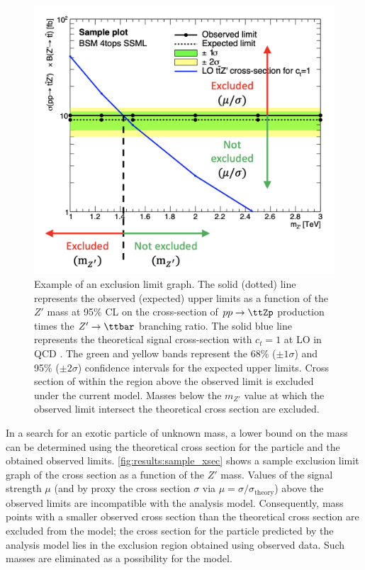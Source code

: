 \documentclass[../thesis.tex]{subfiles}
\begin{document}
\begin{figure}[!htb]
\centering
\includegraphics[width=0.8\linewidth]{fig/theory_sample_xsec.png}
\caption{\label{fig:results:sample_xsec}Example of an exclusion limit graph. The solid (dotted) line represents the observed (expected) upper limits as a function of the $Z'$ mass at 95\% \acs{CL} on the cross-section of $pp\rightarrow\ttZp$ production times the $Z'\rightarrow\ttbar$ branching ratio. The solid blue line represents the theoretical signal cross-section with $c_t=1$ at \acs{LO} in \acs{QCD} \citep{theory:ttZp_LHC}. The green and yellow bands represent the 68\% ($\pm 1\sigma$) and 95\% ($\pm 2\sigma$) confidence intervals for the expected upper limits. Cross section of \ttZp within the region above the observed limit is excluded under the current model. Masses below the $m_{Z'}$ value at which the observed limit intersect the theoretical cross section are excluded.}
\end{figure}

In a search for an exotic particle of unknown mass, a lower bound on the mass can be determined using the theoretical cross section for the particle and the obtained observed limits. \autoref{fig:results:sample_xsec} shows a sample exclusion limit graph of the \ttZp cross section as a function of the $Z'$ mass. Values of the signal strength $\mu$ (and by proxy the cross section $\sigma$ via $\mu=\sigma/\sigma_\text{theory}$) above the observed limits are incompatible with the analysis model. Consequently, mass points with a smaller observed cross section than the theoretical cross section are excluded from the model; the cross section for the particle predicted by the analysis model lies in the exclusion region obtained using observed data. Such masses are eliminated as a possibility for the model.
\end{document}
